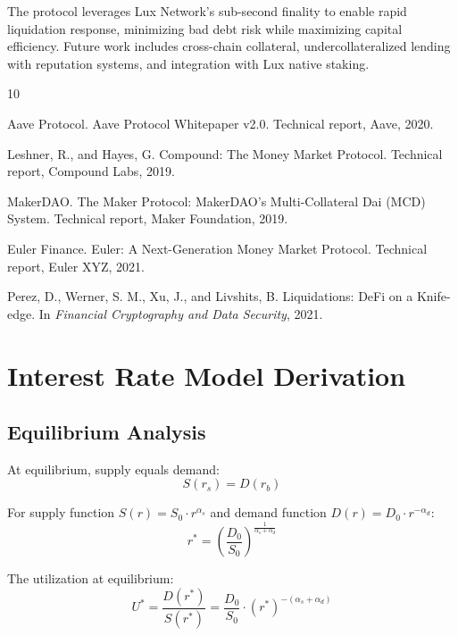 \documentclass[11pt,a4paper]{article}
\begin{document}
The protocol leverages Lux Network's sub-second finality to enable rapid liquidation response, minimizing bad debt risk while maximizing capital efficiency. Future work includes cross-chain collateral, undercollateralized lending with reputation systems, and integration with Lux native staking.


\begin{thebibliography}{10}

Aave Protocol.
\newblock Aave Protocol Whitepaper v2.0.
\newblock Technical report, Aave, 2020.

Leshner, R., and Hayes, G.
\newblock Compound: The Money Market Protocol.
\newblock Technical report, Compound Labs, 2019.

MakerDAO.
\newblock The Maker Protocol: MakerDAO's Multi-Collateral Dai (MCD) System.
\newblock Technical report, Maker Foundation, 2019.

Euler Finance.
\newblock Euler: A Next-Generation Money Market Protocol.
\newblock Technical report, Euler XYZ, 2021.

Perez, D., Werner, S. M., Xu, J., and Livshits, B.
\newblock Liquidations: DeFi on a Knife-edge.
\newblock In \emph{Financial Cryptography and Data Security}, 2021.

\end{thebibliography}

\appendix

\section{Interest Rate Model Derivation}

\subsection{Equilibrium Analysis}

At equilibrium, supply equals demand:
\begin{equation}
    S(r_s) = D(r_b)
\end{equation}

For supply function $S(r) = S_0 \cdot r^{\alpha_s}$ and demand function $D(r) = D_0 \cdot r^{-\alpha_d}$:
\begin{equation}
    r^* = \left(\frac{D_0}{S_0}\right)^{\frac{1}{\alpha_s + \alpha_d}}
\end{equation}

The utilization at equilibrium:
\begin{equation}
    U^* = \frac{D(r^*)}{S(r^*)} = \frac{D_0}{S_0} \cdot (r^*)^{-(\alpha_s + \alpha_d)}
\end{equation}
\end{document}
